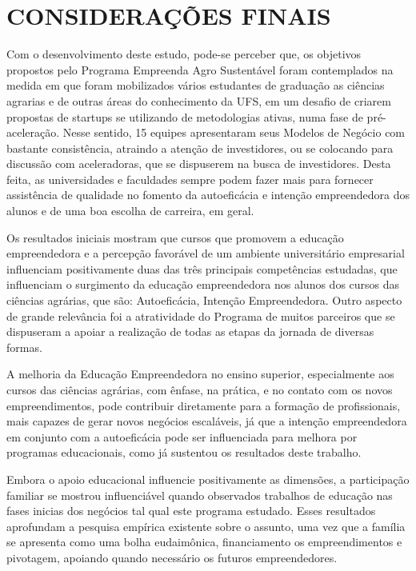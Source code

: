 \chapter{CONSIDERAÇÕES FINAIS}


Com o desenvolvimento deste estudo, pode-se perceber que, os objetivos propostos pelo Programa Empreenda Agro Sustentável foram contemplados na medida em que foram mobilizados vários estudantes de graduação as ciências agrarias e de outras áreas do conhecimento da UFS, em um desafio de criarem propostas de startups se utilizando de metodologias ativas, numa fase de pré-aceleração. Nesse sentido, 15 equipes apresentaram seus Modelos de Negócio com bastante consistência, atraindo a atenção de investidores, ou se colocando para discussão com aceleradoras, que se dispuserem na busca de investidores. Desta feita, as universidades e faculdades sempre podem fazer mais para fornecer assistência de qualidade no fomento da autoeficácia e intenção empreendedora dos alunos e de uma boa escolha de carreira, em geral.

Os resultados iniciais mostram que cursos que promovem a educação empreendedora e a percepção favorável de um ambiente universitário empresarial influenciam positivamente duas das três principais competências estudadas, que influenciam o surgimento da educação empreendedora nos alunos dos cursos das ciências agrárias, que são: Autoeficácia, Intenção Empreendedora. Outro aspecto de grande relevância foi a atratividade do Programa de muitos parceiros que se dispuseram a apoiar a realização de todas as etapas da jornada de diversas formas.

A melhoria da Educação Empreendedora no ensino superior, especialmente aos cursos das ciências agrárias, com ênfase, na prática, e no contato com os novos empreendimentos, pode contribuir diretamente para a formação de profissionais, mais capazes de gerar novos negócios escaláveis, já que a intenção empreendedora em conjunto com a autoeficácia pode ser influenciada para melhora por programas educacionais, como já sustentou os resultados deste trabalho.

Embora o apoio educacional influencie positivamente as dimensões, a participação familiar se mostrou influenciável quando observados trabalhos de educação nas fases inicias dos negócios tal qual este programa estudado. Esses resultados aprofundam a pesquisa empírica existente sobre o assunto, uma vez que a família se apresenta como uma bolha eudaimônica, financiamento os empreendimentos e pivotagem, apoiando quando necessário os futuros empreendedores.

